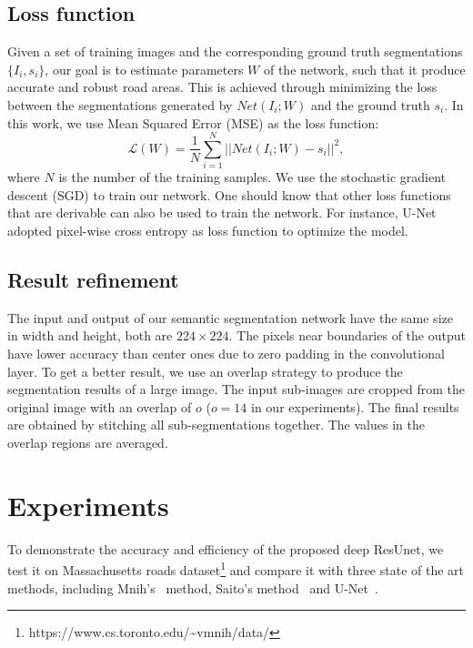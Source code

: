 \documentclass[journal]{IEEEtran}
\begin{document}
\subsection{Loss function}
Given a set of training images and the corresponding ground truth segmentations $\{I_i,s_i\}$, our goal is to estimate parameters $W$ of the network, such that it produce accurate and robust road areas. This is achieved through minimizing the loss between the  segmentations generated by $Net(I_i;W)$ and the ground truth $s_i$. In this work, we use Mean Squared Error (MSE) as the loss function:
\begin{equation}\label{Equ:mse}
\mathcal{L}(W) = \frac{1}{N}\sum\limits^{N}_{i=1}||Net(I_i;W) - s_i||^2,
\end{equation}
where $N$ is the number of the training samples. We use the stochastic gradient descent (SGD) to train our network. One should know that other loss functions that are derivable can also be used to train the network. For instance, U-Net adopted pixel-wise cross entropy as loss function to optimize the model. 

\subsection{Result refinement}

The input and output of our semantic segmentation network have the same size in width and height, both are $224\times224$. The pixels near  boundaries of the output have lower accuracy than center ones due to zero padding in the convolutional layer. To get a better result, we use an overlap strategy to produce the segmentation results of a large image. The input sub-images are cropped from the original image with an overlap of $o$ ($o=14$ in our experiments). The final results are obtained by stitching all sub-segmentations together. The values in the overlap regions are averaged. 

\vspace{-0.2cm}
\section{Experiments}
\label{sec:experiment}

To demonstrate the accuracy and efficiency of the proposed deep ResUnet, we test it on Massachusetts roads dataset\footnote{https://www.cs.toronto.edu/\~{}vmnih/data/} and compare it with three state of the art methods, including Mnih's~\cite{mnih2010learning} method, Saito's method~\cite{Saito2016Multiple} and U-Net~\cite{U-NET2015}. 
\end{document}
